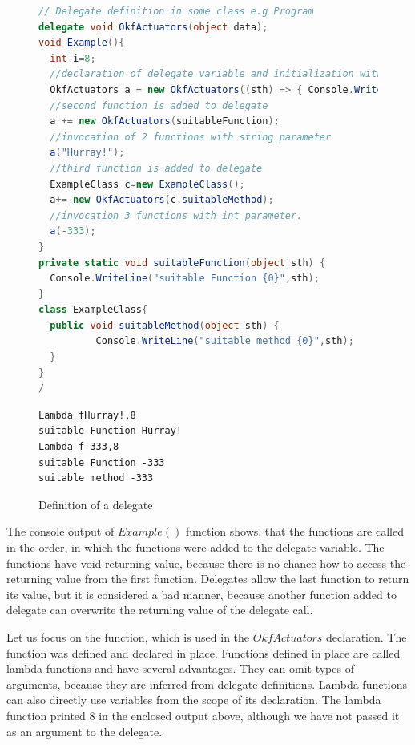 \begin{figure}[!hbp]
\begin{lstlisting}[language=cs]
// Delegate definition in some class e.g Program
delegate void OkfActuators(object data);
void Example(){
  int i=8;
  //declaration of delegate variable and initialization with lambda function
  OkfActuators a = new OkfActuators((sth) => { Console.WriteLine("Lambda f{0},{1}",sth,i); });
  //second function is added to delegate
  a += new OkfActuators(suitableFunction);
  //invocation of 2 functions with string parameter
  a("Hurray!");
  //third function is added to delegate
  ExampleClass c=new ExampleClass();
  a+= new OkfActuators(c.suitableMethod);
  //invocation 3 functions with int parameter.
  a(-333);
}
private static void suitableFunction(object sth) { 
  Console.WriteLine("suitable Function {0}",sth);
}
class ExampleClass{
  public void suitableMethod(object sth) { 	
          Console.WriteLine("suitable method {0}",sth);	
  }
}
/\end{lstlisting}
\caption{Definition of a delegate} \label{deleg}

\begin{verbatim}
Lambda fHurray!,8
suitable Function Hurray!
Lambda f-333,8
suitable Function -333
suitable method -333
\end{verbatim}
\end{figure}
  The console output of $Example()$ function shows, that the functions are called in the order, in
  which the functions were added to the delegate variable. 
  The functions have void returning value, because there is no chance how to access
  the returning value from the first function. Delegates allow the last function to return its value, 
  but it is considered a bad manner, because
  another function added to delegate can overwrite the returning value of the delegate call.

  Let us focus on the function, which is used in the $OkfActuators$ declaration. The function 
  was defined and declared in place. Functions defined in place are called lambda functions 
  and have several advantages. 
  They can omit types of arguments, because they are inferred from delegate definitions. Lambda functions
  can also directly use variables from the scope of its declaration. 
  The lambda function printed $8$ in the enclosed output above,
  although we have not passed it as an argument to the delegate.

